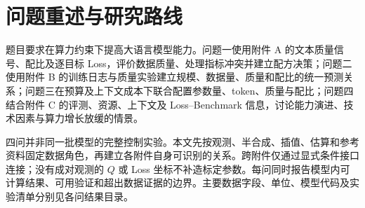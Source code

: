\section{问题重述与研究路线}
题目要求在算力约束下提高大语言模型能力。问题一使用附件 A 的文本质量信号、配比及逐目标 Loss，评价数据质量、处理指标冲突并建立配方决策；问题二使用附件 B 的训练日志与质量实验建立规模、数据量、质量和配比的统一预测关系；问题三在预算及上下文成本下联合配置参数量、token、质量与配比；问题四结合附件 C 的评测、资源、上下文及 Loss--Benchmark 信息，讨论能力演进、技术因素与算力增长放缓的情景。

四问并非同一批模型的完整控制实验。本文先按观测、半合成、插值、估算和参考资料固定数据角色，再建立各附件自身可识别的关系。跨附件仅通过显式条件接口连接；没有成对观测的 $Q$ 或 Loss 坐标不补造标定参数。每问同时报告模型内可计算结果、可用验证和超出数据证据的边界。主要数据字段、单位、模型代码及实验清单分别见各问结果目录。
